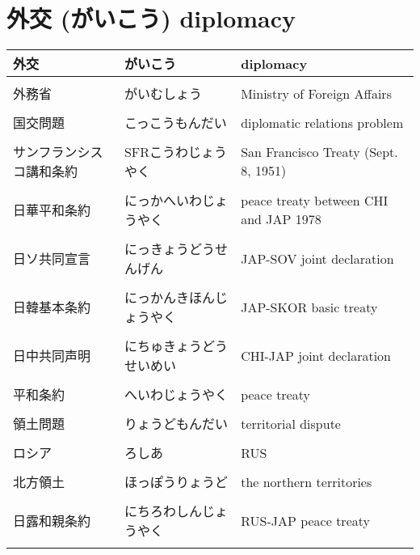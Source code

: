 \documentclass{article}
\begin{document}
\section{外交 (がいこう) diplomacy}
\begin{tabular}{  l | l | p{7.5cm} }
 外交 					& がいこう 				& diplomacy   							\\ \hline \\[-1em]
 外務省					& がいむしょう			& Ministry of Foreign Affairs 			\\ \hline \\[-1em]
 国交問題					& こっこうもんだい			& diplomatic relations problem 			\\ \hline \\[-1em]
 サンフランシスコ講和条約 		& SFRこうわじょうやく 		& San Francisco Treaty (Sept. 8, 1951)	\\ \hline \\[-1em]
 日華平和条約				& にっかへいわじょうやく  	& peace treaty between CHI and JAP 1978	\\ \hline \\[-1em]
 日ソ共同宣言				& にっきょうどうせんげん 	& JAP-SOV joint declaration 			\\ \hline \\[-1em]
 日韓基本条約				& にっかんきほんじょうやく	& JAP-SKOR basic treaty					\\ \hline \\[-1em]
 日中共同声明				& にちゅきょうどうせいめい	& CHI-JAP joint declaration 			\\ \hline \\[-1em]
 平和条約					& へいわじょうやく 		& peace treaty 							\\ \hline \\[-1em]
 領土問題					& りょうどもんだい			& territorial dispute 					\\ \hline \\[-1em]
 ロシア					& ろしあ				& RUS									\\ \hline \\[-1em]
 北方領土					& ほっぽうりょうど 		& the northern territories				\\ \hline \\[-1em]
 日露和親条約				& にちろわしんじょうやく		& RUS-JAP peace treaty					\\ \hline \\[-1em]

\end{tabular}
\end{document}
